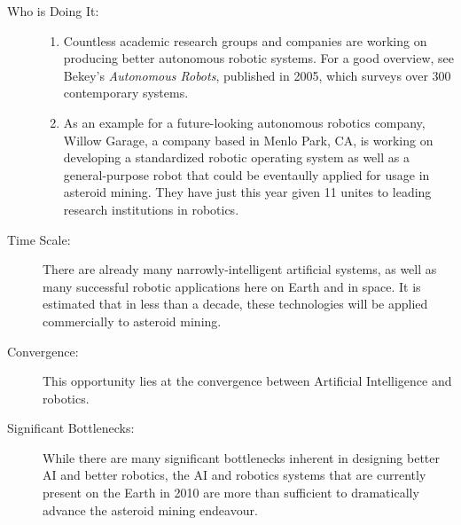 \begin{description}
\item[Who is Doing It:]
\hfill
\begin{enumerate}
\item Countless academic research groups and companies are working on producing
better autonomous robotic systems. For a good overview, see Bekey's
\emph{Autonomous Robots}, published in 2005, which surveys over 300
contemporary systems\cite{bekey}.
\item As an example for a future-looking autonomous robotics company, Willow
Garage, a company based in Menlo Park, CA, is working on developing
a standardized robotic operating system as well as a general-purpose
robot that could be eventaully applied for usage in asteroid mining.
They have just this year given 11 unites to leading research institutions
in robotics\cite{willow}.
\end{enumerate}

\item[Time Scale:]

There are already many narrowly-intelligent artificial systems, as
well as many successful robotic applications here on Earth and in
space. It is estimated that in less than a decade, these technologies
will be applied commercially to asteroid mining.


\item[Convergence:]

This opportunity lies at the convergence between Artificial Intelligence
and robotics.


\item[Significant Bottlenecks:]

While there are many significant bottlenecks inherent in designing
better AI and better robotics, the AI and robotics systems that are
currently present on the Earth in 2010 are more than sufficient to
dramatically advance the asteroid mining endeavour.
\end{description}
 
